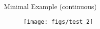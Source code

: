 \begin{frame}{Minimal Example (continuous)}

  \begin{figure}[h]
    \texttt{[image: figs/test\_2]}
  \end{figure}  

\end{frame}

